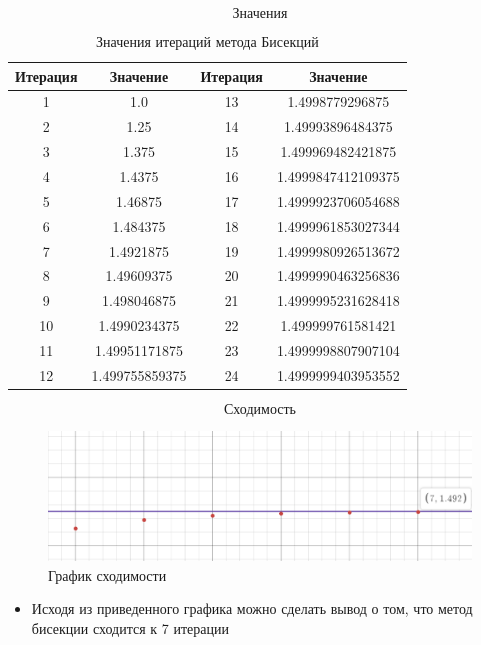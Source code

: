 \documentclass{article}
\begin{document}
$$\textbf{Значения}$$
\begin{table}[h!]
\centering
\begin{tabular}{|c|c|c|c|}
\hline
Итерация & Значение & Итерация & Значение \\
\hline
1 & 1.0 & 13 & 1.4998779296875 \\
\hline
2 & 1.25 & 14 & 1.49993896484375 \\
\hline
3 & 1.375 & 15 & 1.499969482421875 \\
\hline
4 & 1.4375 & 16 & 1.4999847412109375 \\
\hline
5 & 1.46875 & 17 & 1.4999923706054688 \\
\hline
6 & 1.484375 & 18 & 1.4999961853027344 \\
\hline
7 & 1.4921875 & 19 & 1.4999980926513672 \\
\hline
8 & 1.49609375 & 20 & 1.4999990463256836 \\
\hline
9 & 1.498046875 & 21 & 1.4999995231628418 \\
\hline
10 & 1.4990234375 & 22 & 1.499999761581421 \\
\hline
11 & 1.49951171875 & 23 & 1.4999998807907104 \\
\hline
12 & 1.499755859375 & 24 & 1.4999999403953552 \\
\hline
\end{tabular}
\caption{Значения итераций метода Бисекций}
\end{table}


$$\textbf{Сходимость}$$
\begin{figure}[H]
    \centering
    \includegraphics[width=\textwidth]{lab_7_4.png}
    \caption{График сходимости}
    \label{fig:my_label}
\end{figure}
\begin{itemize}
    \item Исходя из приведенного графика можно сделать вывод о том, что метод бисекции сходится к 7 итерации
\end{itemize}
\end{document}

